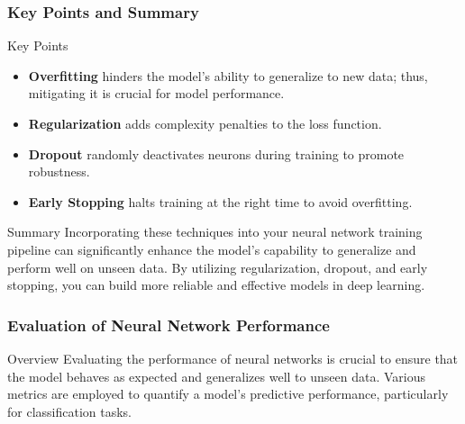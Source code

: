 \documentclass[aspectratio=169]{beamer}
\begin{document}
\begin{frame}[fragile]
    \frametitle{Key Points and Summary}
    \begin{block}{Key Points}
        \begin{itemize}
            \item \textbf{Overfitting} hinders the model's ability to generalize to new data; thus, mitigating it is crucial for model performance.
            \item \textbf{Regularization} adds complexity penalties to the loss function.
            \item \textbf{Dropout} randomly deactivates neurons during training to promote robustness.
            \item \textbf{Early Stopping} halts training at the right time to avoid overfitting.
        \end{itemize}
    \end{block}

    \begin{block}{Summary}
        Incorporating these techniques into your neural network training pipeline can significantly enhance the model's capability to generalize and perform well on unseen data. By utilizing regularization, dropout, and early stopping, you can build more reliable and effective models in deep learning.
    \end{block}
\end{frame}

\begin{frame}[fragile]
    \frametitle{Evaluation of Neural Network Performance}
    \begin{block}{Overview}
        Evaluating the performance of neural networks is crucial to ensure that the model behaves as expected
        and generalizes well to unseen data. Various metrics are employed to quantify a model's predictive performance,
        particularly for classification tasks.
    \end{block}
\end{frame}
\end{document}
